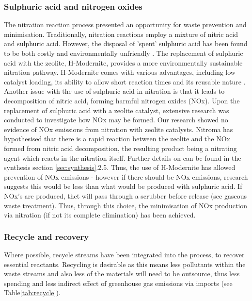 \subsubsection{Sulphuric acid and nitrogen oxides}
The nitration reaction process presented an opportunity for waste prevention and minimisation. Traditionally, nitration reactions employ a mixture of nitric acid and sulphuric acid. However, the disposal of 'spent' sulphuric acid has been found to be both costly and environmentally unfriendly \cite{smith_superior_1996}. The replacement of sulphuric acid with the zeolite, H-Modernite, provides a more environmentally sustainable nitration pathway. H-Modernite comes with various advantages, including low catalyst loading, its ability to allow short reaction times and its reusable nature \cite{smith_superior_1996}. Another issue with the use of sulphuric acid in nitration is that it leads to decomposition of nitric acid, forming harmful nitrogen oxides (NOx). Upon the replacement of sulphuric acid with a zeolite catalyst, extensive research was conducted to investigate how NOx may be formed. Our research showed no evidence of NOx emissions from nitration with zeolite catalysts. Nitroma has hypothesised that there is a rapid reaction between the zeolite and the NOx formed from nitric acid decomposition, the resulting product being a nitrating agent which reacts in the nitration itself. Further details on can be found in the synthesis section \ref{sec:synthesis}.2.5. Thus, the use of H-Modernite has allowed prevention of NOx emissions - however if there should be NOx emissions, research suggests this would be less than what would be produced with sulphuric acid. If NOx's are produced, thet will pass through a scrubber before release (see gaseous waste treatment). Thus, through this choice, the minimisation of NOx production via nitration (if not its complete elimination) has been achieved. 

\subsubsection{Recycle and recovery}

Where possible, recycle streams have been integrated into the process, to recover essential reactants. Recycling is desirable as this means less pollutants within the waste streams and also less of the materials will need to be outsource, thus less spending and less indirect effect of greenhouse gas emissions via imports (see Table\ref{tab:recycle}).

